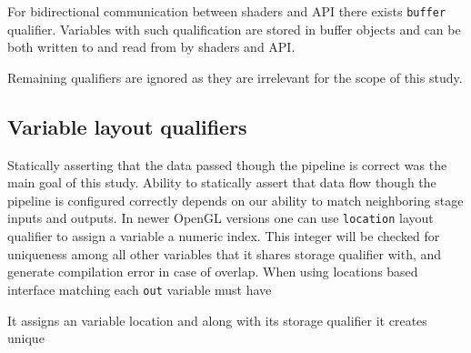 For bidirectional communication between shaders and API there exists \texttt{buffer} qualifier. Variables with such qualification are stored in buffer objects and can be both written to and read from by shaders and API.

Remaining qualifiers are ignored as they are irrelevant for the scope of this study.

\subsection{Variable layout qualifiers}

Statically asserting that the data passed though the pipeline is correct was the main goal of this study.
Ability to statically assert that data flow though the pipeline is configured correctly depends on our ability to match neighboring stage inputs and outputs.
In newer OpenGL versions one can use \texttt{location} layout qualifier to assign a variable a numeric index.
This integer will be checked for uniqueness among all other variables that it shares storage qualifier with, and generate compilation error in case of overlap.
When using locations based interface matching each \texttt{out} variable must have

It assigns an variable location and along with its storage qualifier it creates unique 


